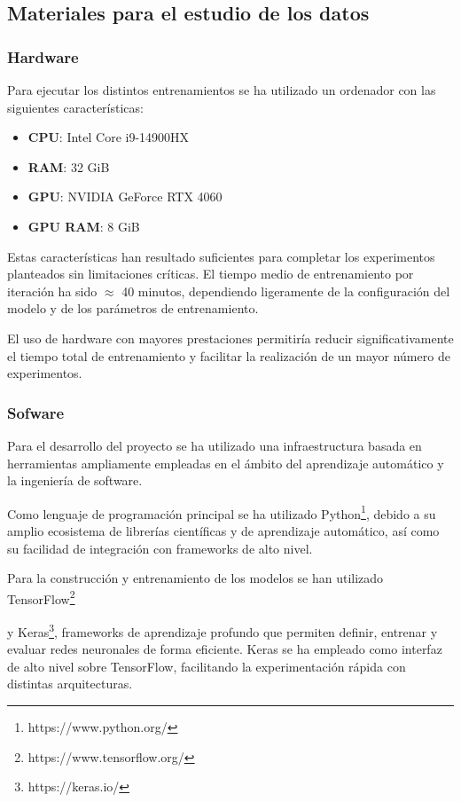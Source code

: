 \subsection{Materiales para el estudio de los datos}\label{sec:materiales_estudio}
\subsubsection{Hardware}

Para ejecutar los distintos entrenamientos se ha utilizado un ordenador con las siguientes características:

\begin{itemize}
    \item \textbf{CPU}: Intel Core i9-14900HX
    \item \textbf{RAM}: 32 GiB
    \item \textbf{GPU}: NVIDIA GeForce RTX 4060
    \item \textbf{GPU RAM}: 8 GiB
\end{itemize}

Estas características han resultado suficientes para completar los experimentos planteados sin limitaciones críticas.
El tiempo medio de entrenamiento por iteración ha sido \(\approx\) 40 minutos, dependiendo ligeramente de la configuración del modelo y de los parámetros de entrenamiento.

El uso de hardware con mayores prestaciones permitiría reducir significativamente el tiempo total de entrenamiento y facilitar la realización de un mayor número de experimentos.

\subsubsection{Sofware}\label{sec:software}

Para el desarrollo del proyecto se ha utilizado una infraestructura basada en herramientas ampliamente empleadas en el ámbito del aprendizaje automático y la ingeniería de software.

Como lenguaje de programación principal se ha utilizado Python\footnote{https://www.python.org/}, debido a su amplio ecosistema de librerías científicas y de aprendizaje automático, así como su facilidad de integración con frameworks de alto nivel.

Para la construcción y entrenamiento de los modelos se han utilizado TensorFlow\footnote{https://www.tensorflow.org/}\par y Keras\footnote{https://keras.io/}, frameworks de aprendizaje profundo que permiten definir, entrenar y evaluar redes neuronales de forma eficiente. Keras se ha empleado como interfaz de alto nivel sobre TensorFlow, facilitando la experimentación rápida con distintas arquitecturas.

